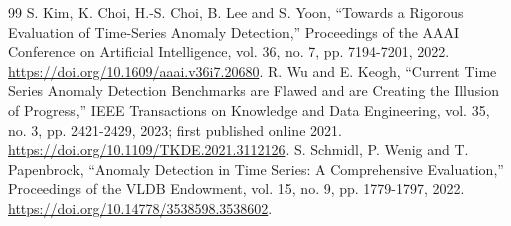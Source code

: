 \documentclass[10pt,a4paper,twocolumn]{article}
\begin{document}
\begin{thebibliography}{99}
 S. Kim, K. Choi, H.-S. Choi, B. Lee and S. Yoon, ``Towards a Rigorous Evaluation of Time-Series Anomaly Detection,'' Proceedings of the AAAI Conference on Artificial Intelligence, vol. 36, no. 7, pp. 7194-7201, 2022. \url{https://doi.org/10.1609/aaai.v36i7.20680}.
 R. Wu and E. Keogh, ``Current Time Series Anomaly Detection Benchmarks are Flawed and are Creating the Illusion of Progress,'' IEEE Transactions on Knowledge and Data Engineering, vol. 35, no. 3, pp. 2421-2429, 2023; first published online 2021. \url{https://doi.org/10.1109/TKDE.2021.3112126}.
 S. Schmidl, P. Wenig and T. Papenbrock, ``Anomaly Detection in Time Series: A Comprehensive Evaluation,'' Proceedings of the VLDB Endowment, vol. 15, no. 9, pp. 1779-1797, 2022. \url{https://doi.org/10.14778/3538598.3538602}.
\end{thebibliography}
\end{document}
